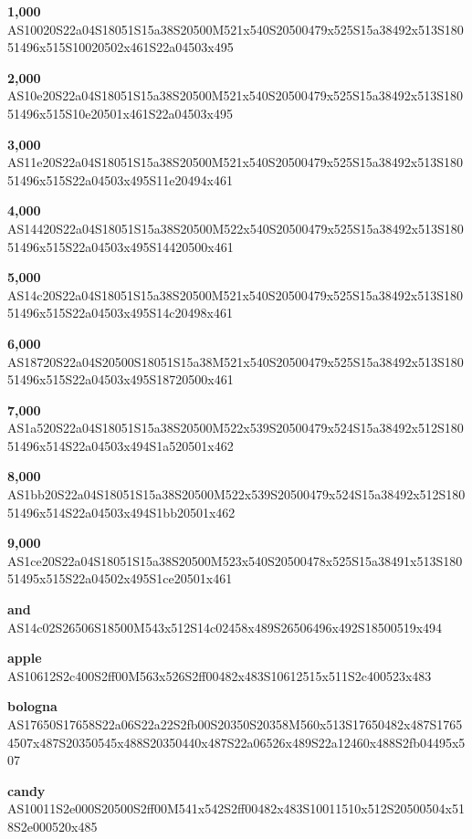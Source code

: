 \documentclass{article}
\begin{document}
\begin{glossary}

\textbf{1,000}\\
AS10020S22a04S18051S15a38S20500M521x540S20500479x525S15a38492x513S18051496x515S10020502x461S22a04503x495

\textbf{2,000}\\
AS10e20S22a04S18051S15a38S20500M521x540S20500479x525S15a38492x513S18051496x515S10e20501x461S22a04503x495

\textbf{3,000}\\
AS11e20S22a04S18051S15a38S20500M521x540S20500479x525S15a38492x513S18051496x515S22a04503x495S11e20494x461

\textbf{4,000}\\
AS14420S22a04S18051S15a38S20500M522x540S20500479x525S15a38492x513S18051496x515S22a04503x495S14420500x461

\textbf{5,000}\\
AS14c20S22a04S18051S15a38S20500M521x540S20500479x525S15a38492x513S18051496x515S22a04503x495S14c20498x461

\textbf{6,000}\\
AS18720S22a04S20500S18051S15a38M521x540S20500479x525S15a38492x513S18051496x515S22a04503x495S18720500x461

\textbf{7,000}\\
AS1a520S22a04S18051S15a38S20500M522x539S20500479x524S15a38492x512S18051496x514S22a04503x494S1a520501x462

\textbf{8,000}\\
AS1bb20S22a04S18051S15a38S20500M522x539S20500479x524S15a38492x512S18051496x514S22a04503x494S1bb20501x462

\textbf{9,000}\\
AS1ce20S22a04S18051S15a38S20500M523x540S20500478x525S15a38491x513S18051495x515S22a04502x495S1ce20501x461

\textbf{and}\\
AS14c02S26506S18500M543x512S14c02458x489S26506496x492S18500519x494

\textbf{apple}\\
AS10612S2c400S2ff00M563x526S2ff00482x483S10612515x511S2c400523x483

\textbf{bologna}\\
AS17650S17658S22a06S22a22S2fb00S20350S20358M560x513S17650482x487S17654507x487S20350545x488S20350440x487S22a06526x489S22a12460x488S2fb04495x507

\textbf{candy}\\
AS10011S2e000S20500S2ff00M541x542S2ff00482x483S10011510x512S20500504x518S2e000520x485


\end{glossary}
\end{document}
